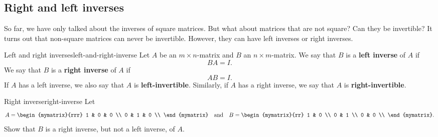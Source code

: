 \subsection{Right and left inverses}

So far, we have only talked about the inverses of square matrices. But
what about matrices that are not square? Can they be invertible? It
turns out that non-square matrices can never be invertible. However,
they can have left inverses or right inverses.

\begin{definition}{Left and right inverses}{left-and-right-inverse}
  Let $A$ be an $m\times n$-matrix and $B$ an $n\times m$-matrix.
  We say that $B$ is a \textbf{left inverse}%
   of
  $A$ if
  \begin{equation*}
    BA=I.
  \end{equation*}
  We say that $B$ is a \textbf{right inverse}%
   of
  $A$ if
  \begin{equation*}
    AB=I.
  \end{equation*}
  If $A$ has a left inverse, we also say that $A$ is
  \textbf{left-invertible}. Similarly, if $A$ has a right inverse, we
  say that $A$ is \textbf{right-invertible}.
\end{definition}

\begin{example}{Right inverse}{right-inverse}
  Let
  \begin{equation*}
    A = \begin{mymatrix}{rrr}
      1 & 0 & 0 \\
      0 & 1 & 0 \\
    \end{mymatrix}
    \quad\mbox{and}\quad
    B = \begin{mymatrix}{rr}
      1 & 0 \\
      0 & 1 \\
      0 & 0 \\
    \end{mymatrix}.
  \end{equation*}
  Show that $B$ is a right inverse, but not a left inverse, of $A$.
\end{example}

